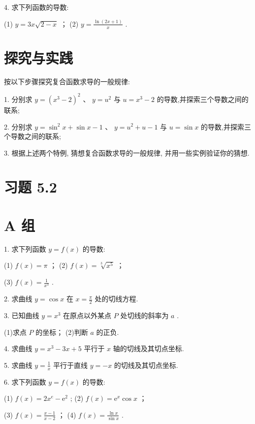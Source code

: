 \documentclass[10pt]{article}
\begin{document}
4. 求下列函数的导数:

(1) \(y = {3x}\sqrt{2 - x}\) ； (2) \(y = \frac{\ln \left( {{2x} + 1}\right) }{x}\) .

\section*{探究与实践}

按以下步骤探究复合函数求导的一般规律:

1. 分别求 \(y = {\left( {x}^{3} - 2\right) }^{2}\text{ 、 }y = {u}^{2}\) 与 \(u = {x}^{3} - 2\) 的导数,并探索三个导数之间的联系;

2. 分别求 \(y = {\sin }^{2}x + \sin x - 1\text{ 、 }y = {u}^{2} + u - 1\) 与 \(u = \sin x\) 的导数,并探索三个导数之间的联系;

3. 根据上述两个特例, 猜想复合函数求导的一般规律, 并用一些实例验证你的猜想.

\section*{习题 5.2}

\section*{A 组}

1. 求下列函数 \(y = f\left( x\right)\) 的导数:

(1) \(f\left( x\right)  = \pi\) ； (2) \(f\left( x\right)  = \sqrt[3]{{x}^{5}}\) ；

(3) \(f\left( x\right)  = \frac{1}{{x}^{3}}\) .

2. 求曲线 \(y = \cos x\) 在 \(x = \frac{\pi }{2}\) 处的切线方程.

3. 已知曲线 \(y = {x}^{3}\) 在原点以外某点 \(P\) 处切线的斜率为 \(a\) .

(1)求点 \(P\) 的坐标； (2)判断 \(a\) 的正负.

4. 求曲线 \(y = {x}^{3} - {3x} + 5\) 平行于 \(x\) 轴的切线及其切点坐标.

5. 求曲线 \(y = \frac{1}{x}\) 平行于直线 \(y =  - x\) 的切线及其切点坐标.

6. 求下列函数 \(y = f\left( x\right)\) 的导数:

(1) \(f\left( x\right)  = 2{x}^{e} - {\mathrm{e}}^{2}\) ; (2) \(f\left( x\right)  = {\mathrm{e}}^{x}\cos x\) ；

(3) \(f\left( x\right)  = \frac{x - 1}{x - 2}\) ； (4) \(f\left( x\right)  = \frac{\ln x}{\sin x}\) .
\end{document}
